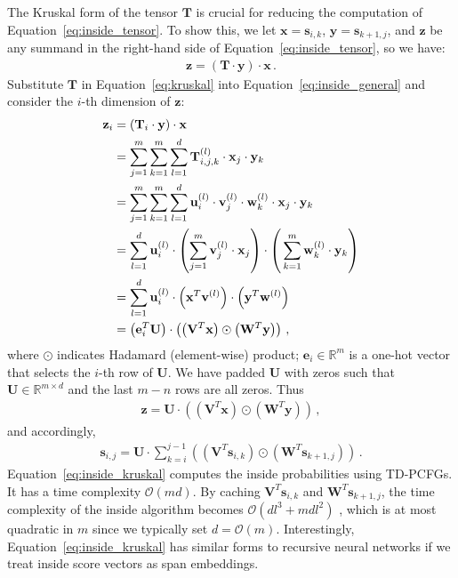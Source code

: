 \documentclass[11pt]{article}
\begin{document}
The Kruskal form of the tensor $\mathbf{T}$ is crucial for reducing the computation of Equation~\ref{eq:inside_tensor}.
To show this, we let $\mathbf{x} = \mathbf{s}_{i, k}$, $\mathbf{y} = \mathbf{s}_{k + 1, j}$, and $\mathbf{z}$ be any summand in the right-hand side of Equation~\ref{eq:inside_tensor}, so we have:
\begin{align}\label{eq:inside_general}
\mathbf{z} = \left(\mathbf{T}\cdot\mathbf{y}\right)\cdot\mathbf{x}\,.
\end{align}
Substitute $\mathbf{T}$ in Equation~\ref{eq:kruskal} into Equation~\ref{eq:inside_general} and consider the $i$-th dimension of $\mathbf{z}$:
\begin{align}
\mathbf{z}_{i} &= (\mathbf{T}_{i}\cdot\mathbf{y})\cdot\mathbf{x} \nonumber \\
&= \sum_{j = 1}^{m}\sum_{k=1}^{m}\sum_{l = 1}^{d}\mathbf{T}_{i, j, k}^{(l)} \cdot\mathbf{x}_{j}\cdot\mathbf{y}_{k} \nonumber \\
&= \sum_{j = 1}^{m}\sum_{k=1}^{m}\sum_{l = 1}^{d} \mathbf{u}^{(l)}_{i}\cdot\mathbf{v}^{(l)}_{j}\cdot\mathbf{w}^{(l)}_{k} \cdot\mathbf{x}_{j}\cdot\mathbf{y}_{k} \nonumber \\
&= \sum_{l = 1}^{d} \mathbf{u}^{(l)}_{i}\cdot
\left(\sum_{j = 1}^{m}\mathbf{v}^{(l)}_{j}\cdot\mathbf{x}_{j}\right)\cdot
\left(\vphantom{\sum_{j = 1}^{m}}\sum_{k=1}^{m}\mathbf{w}^{(l)}_{k} \cdot\mathbf{y}_{k}\right) \nonumber \\
&= \sum_{l = 1}^{d} \mathbf{u}^{(l)}_{i}\cdot
\left(\mathbf{x}^{T}{\mathbf{v}^{(l)}}\right)\cdot
\left(\mathbf{y}^{T}{\mathbf{w}^{(l)}}\right) \nonumber\\
\label{eq:kruskal_hadamard}
&= \left(\mathbf{e}_{i}^{T}\mathbf{U}\right)\cdot
\left(\left(\mathbf{V}^{T}{\mathbf{x}}\right)\odot
\left(\mathbf{W}^{T}{\mathbf{y}}\right)\right)\,, 
\end{align}
where $\odot$ indicates Hadamard (element-wise) product;
$\mathbf{e}_i\in\mathbb{R}^{m}$ is a one-hot vector that selects the $i$-th row of $\mathbf{U}$. 
We have padded $\mathbf{U}$ with zeros such that $\mathbf{U}\in\mathbb{R}^{m\times d}$ and the last $m-n$ rows are all zeros.
Thus
\begin{align}
\mathbf{z} = \mathbf{U}\cdot\left(\left(\mathbf{V}^{T}{\mathbf{x}}\right)\odot
\left(\mathbf{W}^{T}{\mathbf{y}}\right)\right)\,,
\end{align}
and accordingly,
\begin{align}\label{eq:inside_kruskal}
\mathbf{s}_{i, j} = \mathbf{U}\cdot\sum_{k = i}^{j - 1}
\left(\left(\mathbf{V}^{T}{\mathbf{s}_{i, k}}\right)\odot \left(\mathbf{W}^{T}{\mathbf{s}_{k + 1, j}}\right)\right)\,.
\end{align}
Equation~\ref{eq:inside_kruskal} computes the inside probabilities using TD-PCFGs.
It has a time complexity $\mathcal{O}(md)$.
By caching $\mathbf{V}^{T}\mathbf{s}_{i,k}$ and $\mathbf{W}^{T}\mathbf{s}_{k+1, j}$, the time complexity of the inside algorithm becomes $\mathcal{O}(dl^3+mdl^2)$ \cite{cohen-etal-2013-approximate}, which is at most quadratic in $m$ since we typically set $d = \mathcal{O}(m)$. Interestingly, Equation~\ref{eq:inside_kruskal} has similar forms to recursive neural networks \cite{socher-etal-2013-recursive} if we treat inside score vectors as span embeddings.
\end{document}
